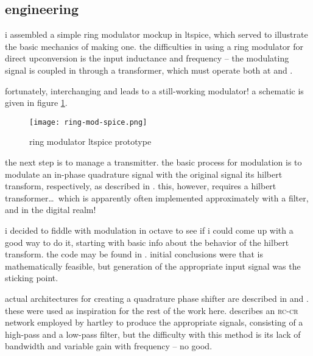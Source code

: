 \subsection*{engineering}
i assembled a simple ring modulator mockup in ltspice, which served to
illustrate the basic mechanics of making one. the difficulties in using a ring
modulator for direct upconversion is the input inductance and frequency -- the
modulating signal is coupled in through a transformer, which must operate both
at \rf and \ifreq.

fortunately, interchanging \rf and \ifreq leads to a still-working modulator! a
schematic is given in figure \ref{fig:ring-mod-spice}.

\begin{figure}[H]
	\centering
	\texttt{[image: ring-mod-spice.png]}
	\caption{ring modulator ltspice prototype}
	\label{fig:ring-mod-spice}
\end{figure}

the next step is to manage a \ssb transmitter. the basic process for \ssb
modulation is to modulate an in-phase \amp quadrature signal with the original
signal \amp its hilbert transform, respectively, as described in
\autocite{matlab-ssb}. this, however, requires a hilbert transformer\ldots\
which is apparently often implemented approximately with a filter, and in the
digital realm!

i decided to fiddle with \ssb modulation in octave to see if i could come up
with a good way to do it, starting with basic info about the behavior of the
hilbert transform. the code may be found in
. initial conclusions were that \ssb is
mathematically feasible, but generation of the appropriate input signal was the
sticking point.

actual architectures for creating a quadrature phase shifter are described in
\autocite{wideband-shifter} and \autocite{audio-shifter}. these were used as
inspiration for the rest of the work here. \autocite{wideband-shifter}
describes an \textsc{rc-cr} network employed by hartley to produce the
appropriate signals, consisting of a high-pass and a low-pass filter, but the
difficulty with this method is its lack of bandwidth and variable gain with
frequency -- no good.
